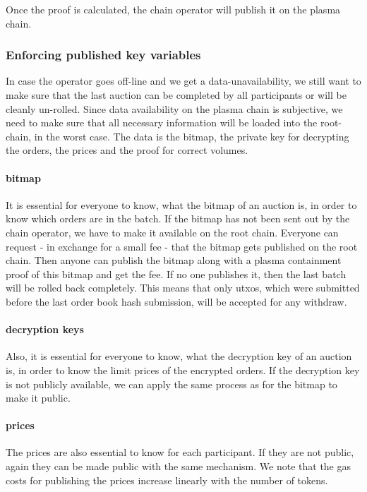 \documentclass[11pt,parskip=full]{scrartcl}%
\begin{document}
Once the proof is calculated, the chain operator will publish it on the plasma chain. 


\subsubsection{Enforcing published key variables}

\label{enforceAvailablity}
In case the operator goes off-line and we get a data-unavailability, we still want to make sure that the last auction can be completed by all participants or will be cleanly un-rolled. 
Since data availability on the plasma chain is subjective, we need to make sure that all necessary information will be loaded into the root-chain, in the worst case. 
The data is the bitmap, the private key for decrypting the orders, the prices and the proof for correct volumes. 

\paragraph{bitmap}
It is essential for everyone to know, what the bitmap of an auction is, in order to know which orders are in the batch. 
If the bitmap has not been sent out by the chain operator, we have to make it available on the root chain. 
Everyone can request - in exchange for a small fee - that the bitmap gets published on the root chain. 
Then anyone can publish the bitmap along with a plasma containment proof of this bitmap and get the fee. 
If no one publishes it, then the last batch will be rolled back completely. 
This means that only utxos, which were submitted before the last order book hash submission, will be accepted for any withdraw. 

\paragraph{decryption keys}
Also, it is essential for everyone to know, what the decryption key of an auction is, in order to know the limit prices of the encrypted orders. 
If the decryption key is not publicly available, we can apply the same process as for the bitmap to make it public. 

\paragraph{prices}
The prices are also essential to know for each participant. 
If they are not public, again they can be made public with the same mechanism. 
We note that the gas costs for publishing the prices increase linearly with the number of tokens. 
\end{document}

